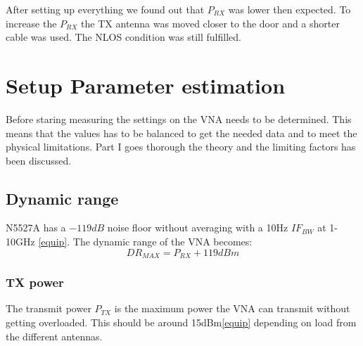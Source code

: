 After setting up everything we found out that $P_{RX}$ was lower then expected. To increase the $P_{RX}$ the TX antenna was moved closer to the door and a shorter cable was used. The NLOS condition was still fulfilled. 

%
%


\chapter{Setup Parameter estimation}
Before staring measuring the settings on the VNA needs to be determined. This means that the values has to be  balanced to get the needed data and to meet the physical limitations. Part I goes thorough the theory and the limiting factors has been discussed.

\section{Dynamic range}
N5527A has a $-119dB$ noise floor without averaging with a 10Hz $IF_{BW}$ at 1-10GHz \autoref{equip}. The dynamic range of the VNA becomes:
\begin{equation}
DR_{MAX} = P_{RX}+119dBm 
\label{NFvna}
\end{equation}

\subsection{TX power}
The transmit power $P_{TX}$ is the maximum power the VNA can transmit without getting overloaded. This should be around 15dBm\autoref{equip} depending on load from the different antennas.
